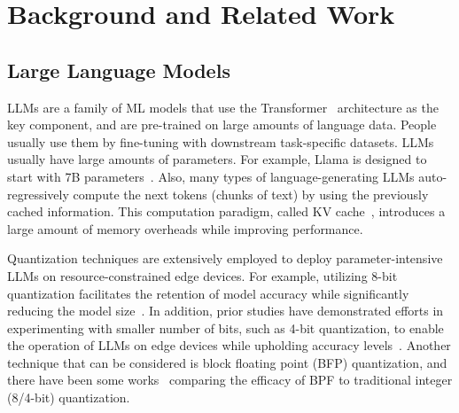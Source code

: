 
\section{Background and Related Work}




\subsection{Large Language Models }

LLMs are a family of ML models that use the Transformer~\cite{vaswani2017attention} architecture as the key component, and are pre-trained on large amounts of language data.
People usually use them by fine-tuning with downstream task-specific datasets.
LLMs usually have large amounts of parameters.
For example, Llama is designed to start with 7B parameters~\cite{touvron2023llama}.
Also, many types of language-generating LLMs auto-regressively compute the next tokens (chunks of text) by using the previously cached information.
This computation paradigm, called KV cache~\cite{kwon2023efficient}, introduces a large amount of memory overheads while improving performance.

Quantization techniques are extensively employed to deploy parameter-intensive LLMs on resource-constrained edge devices.
For example, utilizing 8-bit quantization facilitates the retention of model accuracy while significantly reducing the model size~\cite{Zafrir2019Q8BERT, Wan2024ASP-DAC}.
In addition, prior studies have demonstrated efforts in experimenting with smaller number of bits, such as 4-bit quantization, to enable the operation of LLMs on edge devices while upholding accuracy levels~\cite{Shen2024EdgeQAT}. 
Another technique that can be considered is block floating point (BFP) quantization, and there have been some works~\cite{Rouhani2023Microscaling} comparing the efficacy of BPF to traditional integer (8/4-bit) quantization.




